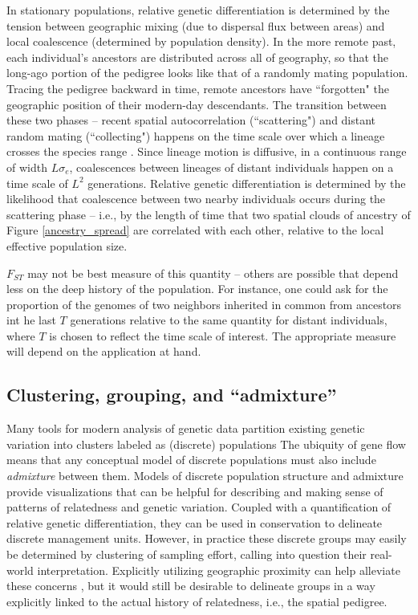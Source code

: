 \documentclass{ar-1col}
\newcommand{\plr}[1]{{\color{green}{#1}}}
\renewcommand{\emph}[1]{{\textit{#1}}}
\begin{document}
In stationary populations,
relative genetic differentiation is determined by the tension between 
geographic mixing (due to dispersal flux between areas)
and local coalescence (determined by population density).
In the more remote past, each individual's ancestors are distributed across
all of geography,
so that the long-ago portion of the pedigree looks like that of a randomly mating population.
Tracing the pedigree backward in time, 
remote ancestors have ``forgotten" the geographic position of their 
modern-day descendants.
The transition between these two phases -- recent spatial autocorrelation 
(``scattering") and distant random mating (``collecting")
\citep{Wakeley1999,wilkins2004separationoftimescales}
happens on the time scale over which a lineage crosses the species range \citep{Wakeley1999}.
Since lineage motion is diffusive, in a continuous range of width $L \sigma_e$,
coalescences between lineages of distant individuals happen on a time scale of $L^2$ generations.
Relative genetic differentiation
is determined by the likelihood that coalescence between two nearby individuals
occurs during the scattering phase
-- i.e., by the length of time that two spatial clouds of ancestry of Figure \ref{ancestry_spread}
are correlated with each other,
relative to the local effective population size.

$F_{ST}$ may not be best measure of this quantity -- 
others are possible that depend less on the deep history of the population.
For instance,
one could ask for the proportion of the genomes of two neighbors 
inherited in common from ancestors int he last $T$ generations
relative to the same quantity for distant individuals,
where $T$ is chosen to reflect the time scale of interest.
The appropriate measure will depend on the application at hand.

\subsection{Clustering, grouping, and ``admixture''}

\plr{I think there's some redundancy below.}

Many tools for modern analysis of genetic data
partition existing genetic variation into clusters labeled as (discrete) populations
\citep[e.g.,][]{STRUCTURE, ADMIXTURE}
The ubiquity of gene flow means that
any conceptual model of discrete populations 
must also include \emph{admixture} between them.
Models of discrete population structure and admixture 
provide visualizations that can be helpful for
describing and making sense of patterns of relatedness and genetic variation.
Coupled with a quantification of relative genetic differentiation,
they can be used in conservation to delineate discrete management units.
However, in practice these discrete groups may easily be determined
by clustering of sampling effort,
calling into question their real-world interpretation.
Explicitly utilizing geographic proximity can help alleviate these concerns \citep{spacemix,conStruct},
but it would still be desirable to delineate groups in a way explicitly linked
to the actual history of relatedness, i.e., the spatial pedigree.
\end{document}
